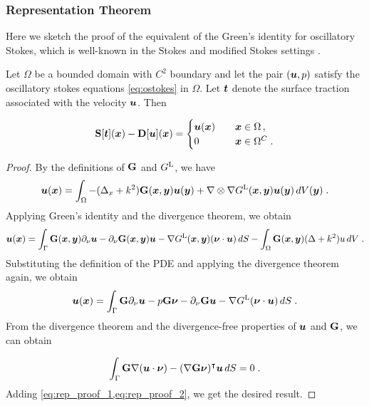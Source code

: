 \subsubsection{Representation Theorem}

Here we sketch the proof of the equivalent of the
Green's identity for oscillatory Stokes, which is well-known
in the Stokes and modified Stokes settings
\cite{Pozrikidis1992,biros2002embedded,ladyzhenskaya1969mathematical}.

\begin{thrm} \label{thrm:rep-theorem}
  Let $\Omega$ be a bounded domain with $C^2$ boundary and let
  the pair $({\boldsymbol u},p)$ satisfy the oscillatory stokes equations
  \cref{eq:ostokes} in $\Omega$. Let ${\boldsymbol t}$ denote the surface
  traction associated with the velocity ${\boldsymbol u}$. Then

  \begin{equation} \label{eq:rep-theorem}
    {\bf S} [{\boldsymbol t}]({\boldsymbol x}) - {\bf D}[{\boldsymbol u}]({\boldsymbol x}) = \begin{cases} 
    {\boldsymbol u}({\boldsymbol x}) &\quad {\boldsymbol x} \in \Omega \, , \\
    0 &\quad {\boldsymbol x} \in \Omega^{C} \; .
    \end{cases}
  \end{equation}
\end{thrm}

\begin{proof}
  By the definitions of ${\bf G}$ and $G^{\textrm{L}}$, we have
  \begin{equation*}
    {\boldsymbol u}({\boldsymbol x}) = \int_\Omega -(\Delta_x + k^2) {\bf G}({\boldsymbol x},{\boldsymbol y}) {\boldsymbol u}({\boldsymbol y})
    + \nabla \otimes \nabla G^{\textrm{L}}({\boldsymbol x},{\boldsymbol y}) {\boldsymbol u}({\boldsymbol y}) \, dV({\boldsymbol y}) \; .
  \end{equation*}
  Applying Green's identity and the divergence theorem, we
  obtain
  \begin{equation}
    {\boldsymbol u}({\boldsymbol x}) = \int_\Gamma {\bf G}({\boldsymbol x},{\boldsymbol y}) \partial_\nu {\boldsymbol u}
    - \partial_\nu {\bf G}({\boldsymbol x},{\boldsymbol y}) {\boldsymbol u}
    - \nabla G^{\textrm{L}}({\boldsymbol x},{\boldsymbol y}) ({\boldsymbol \nu} \cdot {\boldsymbol u}) \, dS 
    - \int_\Omega {\bf G}({\boldsymbol x},{\boldsymbol y}) (\Delta + k^2) u \, dV \; .
    \nonumber
  \end{equation}
  Substituting the definition of the PDE and applying the divergence
  theorem again, we obtain
  \begin{equation}
    {\boldsymbol u}({\boldsymbol x}) = \int_\Gamma {\bf G} \partial_\nu {\boldsymbol u} - p {\bf G} {\boldsymbol \nu} - \partial_\nu {\bf G} {\boldsymbol u}
    - \nabla G^{\textrm{L}} ({\boldsymbol \nu} \cdot {\boldsymbol u}) \, dS  \; . \label{eq:rep_proof_1}
  \end{equation}
  From the divergence theorem and the divergence-free properties of
  ${\boldsymbol u}$ and ${\bf G}$, we can obtain

  \begin{equation}
    \int_\Gamma {\bf G} \nabla ({\boldsymbol u} \cdot {\boldsymbol \nu})
    - (\nabla {\bf G} {\boldsymbol \nu})^\intercal {\boldsymbol u} \, dS = 0 \; .  \label{eq:rep_proof_2}
  \end{equation}
  Adding \cref{eq:rep_proof_1,eq:rep_proof_2}, we get the desired
  result.
\end{proof}

